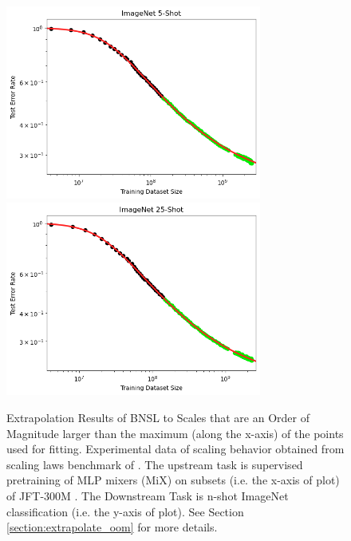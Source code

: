 \documentclass{article} %
\begin{document}
\begin{figure}[htbp]
    \centering
\includegraphics[width=0.75\textwidth]{figures/order_of_magnitude__data_x-axis/imagenet_5___MiX_L_16.png}
\includegraphics[width=0.75\textwidth]{figures/order_of_magnitude__data_x-axis/imagenet_25___MiX_L_16.png}

    \caption{
    Extrapolation Results of BNSL to Scales that are an Order of Magnitude larger than the maximum (along the x-axis) of the points used for fitting. Experimental data of scaling behavior obtained from scaling laws benchmark of \cite{Alabdulmohsi2022revisiting}. The upstream task is supervised pretraining of MLP mixers (MiX) \citep{tolstikhin2021mlp} on subsets (i.e. the x-axis of plot) of JFT-300M \citep{sun2017revisiting}. The Downstream Task is n-shot ImageNet classification (i.e. the y-axis of plot). See Section \ref{section:extrapolate_oom} for more details.
    }
    \label{fig:extrapolate_oom}
\end{figure}
\end{document}
